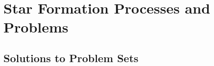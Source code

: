 \documentclass[twoside]{tex/tufte-book} %
\begin{document}
\part{Star Formation Processes and Problems}




















\appendix




\chapter{Solutions to Problem Sets}







\backmatter





\printindex %
\end{document}
